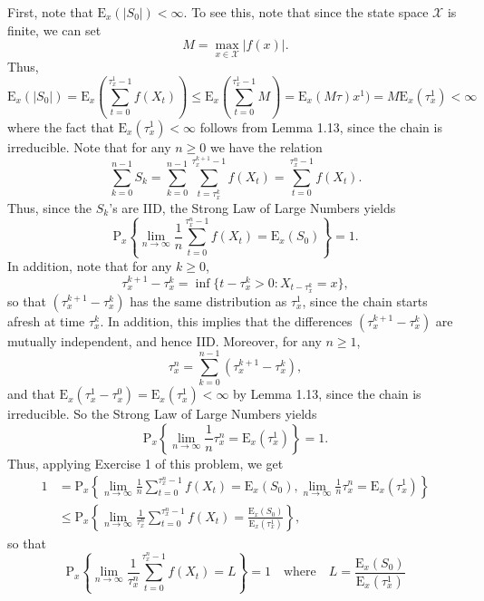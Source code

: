 \documentclass[12pt]{article}
\newcommand{\E}{\mathrm{E}}
\newcommand{\Prob}{\mathrm{P}}
\begin{document}
First, note that $\E_x(|S_0|) < \infty$. To see this, note that since the state space $\mathcal{X}$ is finite, we can set
\begin{equation*}
M = \max_{x \in \mathcal{X}} |f(x)|.
\end{equation*}
Thus,
\begin{equation*}
\E_x(|S_0|) = \E_x\left(\sum_{t=0}^{\tau_x^1 - 1} f(X_t) \right) \leq \E_x\left(\sum_{t=0}^{\tau_x^1 - 1} M \right) = \E_x(M \tau)x^1) = M\E_x(\tau_x^1) < \infty
\end{equation*}
where the fact that $\E_x(\tau_x^1) < \infty$ follows from Lemma 1.13, since the chain is irreducible. Note that for any $n \geq 0$ we have the relation
\begin{equation*}
\sum_{k=0}^{n-1} S_k = \sum_{k=0}^{n-1} \sum_{t=\tau_x^k}^{\tau_x^{k+1} - 1} f(X_t) = \sum_{t=0}^{\tau_x^n - 1} f(X_t).
\end{equation*}
Thus, since the $S_k$'s are IID, the Strong Law of Large Numbers yields
\begin{equation*}
\Prob_x\left\{\lim_{n \to \infty} \frac{1}{n} \sum_{t=0}^{\tau_x^n - 1} f(X_t) = \E_x(S_0) \right\} = 1.
\end{equation*}
In addition, note that for any $k \geq 0$,
\begin{equation*}
\tau_x^{k+1} - \tau_x^k = \inf\{t - \tau_x^k > 0 : X_{t - \tau_x^k} = x\},
\end{equation*}
so that $(\tau_x^{k+1} - \tau_x^k)$ has the same distribution as $\tau_x^1$, since the chain starts afresh at time $\tau_x^k$. In addition, this implies that the differences $(\tau_x^{k+1} - \tau_x^k)$ are mutually independent, and hence IID. Moreover, for any $n \geq 1$,
\begin{equation*}
\tau_x^n = \sum_{k=0}^{n-1} (\tau_x^{k+1} - \tau_x^k),
\end{equation*}
and that $\E_x(\tau_x^1 - \tau_x^0) = \E_x(\tau_x^1) < \infty$ by Lemma 1.13, since the chain is irreducible. So the Strong Law of Large Numbers yields
\begin{equation*}
\Prob_x\left\{\lim_{n \to \infty} \frac{1}{n} \tau_x^n = \E_x(\tau_x^1) \right\} = 1.
\end{equation*}
Thus, applying Exercise 1 of this problem, we get
\begin{align*}
1 &= \Prob_x\left\{\lim_{n \to \infty} \frac{1}{n} \sum_{t=0}^{\tau_x^n - 1} f(X_t) = \E_x(S_0), \lim_{n \to \infty} \frac{1}{n} \tau_x^n = \E_x(\tau_x^1) \right\} \\
&\leq \Prob_x\left\{\lim_{n \to \infty} \frac{1}{\tau_x^n} \sum_{t=0}^{\tau_x^n - 1} f(X_t) = \frac{\E_x(S_0)}{\E_x(\tau_x^1)} \right\},
\end{align*}
so that
\begin{equation*}
\Prob_x\left\{\lim_{n \to \infty} \frac{1}{\tau_x^n} \sum_{t=0}^{\tau_x^n - 1} f(X_t) = L \right\} = 1 \quad \text{where} \quad L = \frac{\E_x(S_0)}{\E_x(\tau_x^1)}
\end{equation*}
\end{document}
